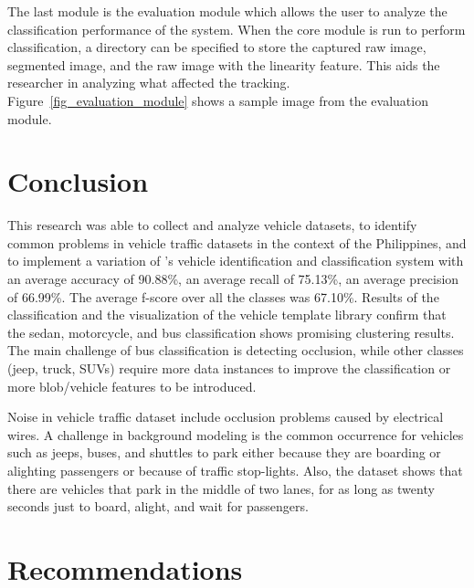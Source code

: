 \documentclass[conference]{IEEEtran}
\begin{document}
The last module is the evaluation module which allows the user to analyze the classification performance of the system. When the core module is run to perform classification, a directory can be specified to store the captured raw image, segmented image, and the raw image with the linearity feature. This aids the researcher in analyzing what affected the tracking. Figure~\ref{fig_evaluation_module} shows a sample image from the evaluation module. 


\section{Conclusion}

This research was able to collect and analyze vehicle datasets, to identify common problems in vehicle traffic datasets in the context of the Philippines, and to implement a variation of \cite{Jun-Wei}'s vehicle identification and classification system with an average accuracy of 90.88\%, an average recall of 75.13\%, an average precision of 66.99\%. The average f-score over all the classes was 67.10\%. Results of the classification and the visualization of the vehicle template library confirm that the sedan, motorcycle, and bus classification shows promising clustering results. The main challenge of bus classification is detecting occlusion, while other classes (jeep, truck, SUVs) require more data instances to improve the classification or more blob/vehicle features to be introduced.

Noise in vehicle traffic dataset include occlusion problems caused by electrical wires. A challenge in background modeling is the common occurrence for vehicles such as jeeps, buses, and shuttles to park either because they are boarding or alighting passengers or because of traffic stop-lights. Also, the dataset shows that there are vehicles that park in the middle of two lanes, for as long as twenty seconds just to board, alight, and wait for passengers. 

\section{Recommendations}
\end{document}
